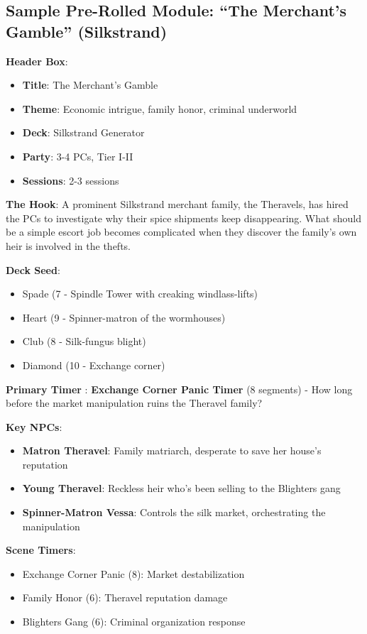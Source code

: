 \documentclass[11pt]{article}
\begin{document}
\subsection*{Sample Pre-Rolled Module: ``The Merchant's Gamble'' (Silkstrand)}

\begin{mdframed}[backgroundcolor=modulebg]
\textbf{Header Box}:
\begin{itemize}[leftmargin=*]
\item \textbf{Title}: The Merchant's Gamble
\item \textbf{Theme}: Economic intrigue, family honor, criminal underworld
\item \textbf{Deck}: Silkstrand Generator
\item \textbf{Party}: 3-4 PCs, Tier I-II
\item \textbf{Sessions}: 2-3 sessions
\end{itemize}

\textbf{The Hook}: A prominent Silkstrand merchant family, the Theravels, has hired the PCs to investigate why their spice shipments keep disappearing. What should be a simple escort job becomes complicated when they discover the family's own heir is involved in the thefts.

\textbf{Deck Seed}: 
\begin{itemize}[leftmargin=*]
\item Spade (7 - Spindle Tower with creaking windlass-lifts)
\item Heart (9 - Spinner-matron of the wormhouses)
\item Club (8 - Silk-fungus blight)
\item Diamond (10 - Exchange corner)
\end{itemize}

\textbf{Primary Timer }: \textbf{Exchange Corner Panic Timer } (8 segments) - How long before the market manipulation ruins the Theravel family?

\textbf{Key NPCs}:
\begin{itemize}[leftmargin=*]
\item \textbf{Matron Theravel}: Family matriarch, desperate to save her house's reputation
\item \textbf{Young Theravel}: Reckless heir who's been selling to the Blighters gang
\item \textbf{Spinner-Matron Vessa}: Controls the silk market, orchestrating the manipulation
\end{itemize}

\textbf{Scene Timers}:
\begin{itemize}[leftmargin=*]
\item Exchange Corner Panic (8): Market destabilization
\item Family Honor (6): Theravel reputation damage  
\item Blighters Gang (6): Criminal organization response
\end{itemize}


\end{mdframed}
\end{document}
